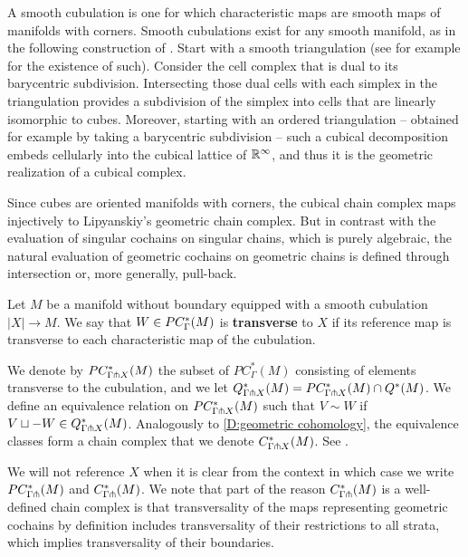 A smooth cubulation is one for which characteristic maps are smooth maps of manifolds with corners.
Smooth cubulations exist for any smooth manifold, as in the following construction of \cite{ShSh92}.
Start with a smooth triangulation (see for example \cite[Theorem 10.6]{Munk66} for the existence of such).
Consider the cell complex that is dual to its barycentric subdivision. Intersecting those dual cells with each simplex in the triangulation provides a subdivision of the simplex into cells that are linearly isomorphic to cubes.
Moreover, starting with an ordered triangulation -- obtained for example by taking a barycentric subdivision -- such a cubical decomposition embeds cellularly into the cubical lattice of $\mathbb{R}^\infty$, and thus it is the geometric realization of a cubical complex.

Since cubes are oriented manifolds with corners, the cubical chain complex maps injectively to Lipyanskiy's geometric chain complex.
But in contrast with the evaluation of singular cochains on singular chains, which is purely algebraic, the natural evaluation of geometric cochains on geometric chains is defined through intersection or, more generally, pull-back.

\begin{definition}
	Let $M$ be a manifold without boundary equipped with a smooth cubulation $|X| \to M$.
	We say that $W \in PC_\Gamma^*(M)$ is \textbf{transverse} to $X$ if its reference map is transverse to each characteristic map of the cubulation.

	We denote by $PC^*_{\Gamma \pitchfork X}(M)$ the subset of $PC_\Gamma^*(M)$ consisting of elements transverse to the cubulation, and we let $Q^*_{\Gamma \pitchfork X}(M) = PC^*_{\Gamma \pitchfork X}(M) \cap Q^*(M)$.
	We define an equivalence relation on $PC^*_{\Gamma \pitchfork X}(M)$ such that $V \sim W$ if $V \sqcup -W \in Q^*_{\Gamma \pitchfork X}(M)$.
	Analogously to \cref{D:geometric cohomology}, the equivalence classes form a chain complex that we denote $C^*_{\Gamma \pitchfork X}(M)$.
	See \cite[Section 6.4]{medina2022foundations}.
\end{definition}

We will not reference $X$ when it is clear from the context in which case we write $PC_{\Gamma \pitchfork}^*(M)$ and $C^*_{\Gamma \pitchfork}(M)$.
We note that part of the reason $C^*_{\Gamma \pitchfork}(M)$ is a well-defined chain complex is that transversality of the maps representing geometric cochains by definition includes transversality of their restrictions to all strata, which implies transversality of their boundaries.

